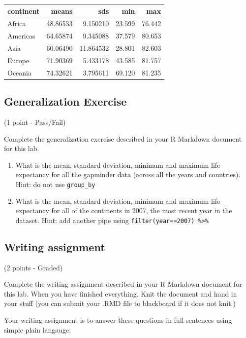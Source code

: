 \documentclass[
]{book}
\begin{document}
\begin{tabular}{l|r|r|r|r}
\hline
continent & means & sds & min & max\\
\hline
Africa & 48.86533 & 9.150210 & 23.599 & 76.442\\
\hline
Americas & 64.65874 & 9.345088 & 37.579 & 80.653\\
\hline
Asia & 60.06490 & 11.864532 & 28.801 & 82.603\\
\hline
Europe & 71.90369 & 5.433178 & 43.585 & 81.757\\
\hline
Oceania & 74.32621 & 3.795611 & 69.120 & 81.235\\
\hline
\end{tabular}

\hypertarget{generalization-exercise-1}{%
\subsection{Generalization Exercise}\label{generalization-exercise-1}}

(1 point - Pass/Fail)

Complete the generalization exercise described in your R Markdown document for this lab.

\begin{enumerate}
\def\labelenumi{\arabic{enumi}.}
\item
  What is the mean, standard deviation, minimum and maximum life expectancy for all the gapminder data (across all the years and countries). Hint: do not use \texttt{group\_by}
\item
  What is the mean, standard deviation, minimum and maximum life expectancy for all of the continents in 2007, the most recent year in the dataset. Hint: add another pipe using \texttt{filter(year==2007)\ \%\textgreater{}\%}
\end{enumerate}

\hypertarget{writing-assignment-1}{%
\subsection{Writing assignment}\label{writing-assignment-1}}

(2 points - Graded)

Complete the writing assignment described in your R Markdown document for this lab. When you have finished everything. Knit the document and hand in your stuff (you can submit your .RMD file to blackboard if it does not knit.)

Your writing assignment is to answer these questions in full sentences using simple plain langauge:
\end{document}
